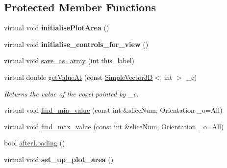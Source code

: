 \subsection*{Protected Member Functions}
\begin{DoxyCompactItemize}
\item 
\mbox{\label{classScreen__manager__ImageData_abe74c16979206c6b5185ec4e0cd7fd98}} 
virtual void {\bfseries initialise\+Plot\+Area} ()
\item 
\mbox{\label{classScreen__manager__ImageData_aea8810a9a70228102f3d8c6826dc87f7}} 
virtual void {\bfseries initialise\+\_\+controls\+\_\+for\+\_\+view} ()
\item 
virtual void \mbox{\hyperlink{classScreen__manager__ImageData_a22e66238720c98f048d6295c7e56465f}{save\+\_\+as\+\_\+array}} (int this\+\_\+label)
\item 
\mbox{\label{classScreen__manager__ImageData_a5a6b9ca733f09425b0d2ce81bf900664}} 
virtual double \mbox{\hyperlink{classScreen__manager__ImageData_a5a6b9ca733f09425b0d2ce81bf900664}{get\+Value\+At}} (const \mbox{\hyperlink{classViewer_1_1SimpleVector3D}{Simple\+Vector3D}}$<$ int $>$ \+\_\+c)
\begin{DoxyCompactList}\small\item\em Returns the value of the voxel pointed by \+\_\+c. \end{DoxyCompactList}\item 
virtual void \mbox{\hyperlink{classScreen__manager__ImageData_acd1f4db9d2d469e2e51972a6b0ad7d27}{find\+\_\+min\+\_\+value}} (const int \&slice\+Num, Orientation \+\_\+o=All)
\item 
virtual void \mbox{\hyperlink{classScreen__manager__ImageData_a16379377a40a7be4d6face323c7c6295}{find\+\_\+max\+\_\+value}} (const int \&slice\+Num, Orientation \+\_\+o=All)
\item 
bool \mbox{\hyperlink{classScreen__manager__ImageData_a93b2f4b16c8b724eb7618e387db21f2c}{after\+Loading}} ()
\item 
\mbox{\label{classScreen__manager_a8285b74dd2913a8368aebb8c4aeccee1}} 
virtual void {\bfseries set\+\_\+up\+\_\+plot\+\_\+area} ()
\item 
\mbox{\label{classScreen__manager_a1e77461fc2c621a338131d25efa28e7a}} 

\end{DoxyCompactItemize}
